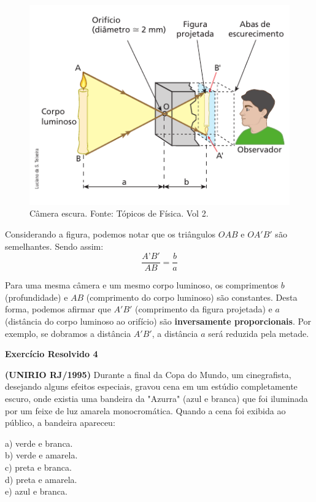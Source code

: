 \documentclass[11pt,twocolumn,oneside]{article}
\begin{document}
\begin{figure}[h]{}
\centering\includegraphics[width=2.5truein]{img22.png}
\caption{Câmera escura. Fonte: Tópicos de Física. Vol 2.}
\centering
\end{figure}

Considerando a figura, podemos notar que os triângulos $OAB$ e $OA'B'$ são semelhantes. Sendo assim:
\begin{equation*}
    \dfrac{A’B'}{AB}=\dfrac{b}{a}
\end{equation*}


Para uma mesma câmera e um mesmo corpo luminoso, os comprimentos \textbf{$b$} (profundidade) e \textbf{$AB$} (comprimento do corpo luminoso) são constantes. Desta forma, podemos afirmar que \textbf{$A'B'$} (comprimento da figura projetada) e \textbf{$a$} (distância do corpo luminoso ao orifício) são \textbf{inversamente proporcionais}. Por exemplo, se dobramos a distância \textbf{$A'B'$}, a distância \textbf{$a$} será reduzida pela metade.


\textbf{Exercício Resolvido 4}


\textbf{(UNIRIO RJ/1995)} Durante a final da Copa do Mundo, um cinegrafista, desejando alguns efeitos especiais, gravou cena em um estúdio completamente escuro, onde existia uma bandeira da "Azurra" (azul e branca) que foi iluminada por um feixe de luz amarela monocromática. Quando a cena foi exibida ao público, a bandeira apareceu:


a)	verde e branca. \\
b)	verde e amarela. \\
c)	preta e branca. \\
d)	preta e amarela. \\
e)	azul e branca.
\end{document}
